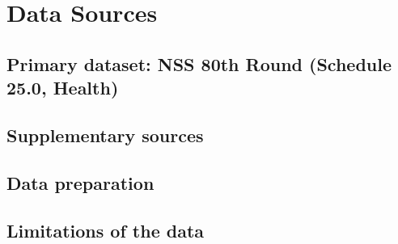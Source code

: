 \section{Data Sources}

\subsection{Primary dataset: NSS 80th Round (Schedule 25.0, Health)}
\lipsum[40]
\subsection{Supplementary sources}
\lipsum[40]
\subsection{Data preparation}
\subsection{Limitations of the data}